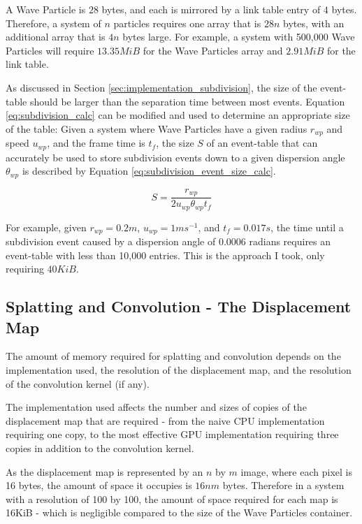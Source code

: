\documentclass[12pt,a4paper,twoside]{report}
\begin{document}
A Wave Particle is $28$ bytes, and each is mirrored by a link table entry of
$4$ bytes. Therefore, a system of $n$ particles requires one array that is
$28n$ bytes, with an additional array that is $4n$ bytes large. For example, a
system with 500,000 Wave Particles will require $13.35MiB$ for the Wave
Particles array and $2.91MiB$ for the link table.

As discussed in Section \ref{sec:implementation_subdivision}, the size of the
event-table should be larger than the separation time between most events.
Equation \ref{eq:subdivision_calc} can be modified and used to determine an
appropriate size of the table: Given a system where Wave Particles have a given
radius $r_{wp}$ and speed $u_{wp}$, and the frame time is $t_f$, the size $S$
of an event-table that can accurately be used to store subdivision events down
to a given dispersion angle $\theta_{wp}$ is described by Equation
\ref{eq:subdivision_event_size_calc}.

\begin{equation}
\label{eq:subdivision_event_size_calc}
S = \frac{r_{wp}}{2 u_{wp} \theta_{wp} t_f}
\end{equation}

For example, given $r_{wp}=0.2m$, $u_{wp}=1ms^{-1}$, and $t_f=0.017s$, the time
until a subdivision event caused by a dispersion angle of 0.0006 radians
requires an event-table with less than 10,000 entries. This is the approach I
took, only requiring $40KiB$.

\subsection{Splatting and Convolution - The Displacement Map}

The amount of memory required for splatting and convolution depends on the
implementation used, the resolution of the displacement map, and the resolution
of the convolution kernel (if any).

The implementation used affects the number and sizes of copies of the
displacement map that are required - from the naive CPU implementation
requiring one copy, to the most effective GPU implementation requiring three
copies in addition to the convolution kernel.

As the displacement map is represented by an $n$ by $m$ image, where each pixel
is 16 bytes, the amount of space it occupies is $16nm$ bytes. Therefore in a
system with a resolution of 100 by 100, the amount of space required for each
map is 16KiB - which is negligible compared to the size of the Wave Particles
container.
\end{document}
